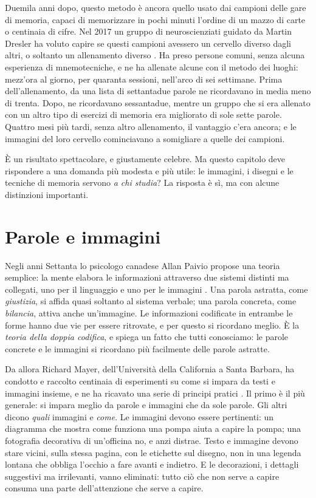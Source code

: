 Duemila anni dopo, questo metodo è ancora quello usato dai campioni delle
gare di memoria, capaci di memorizzare in pochi minuti
l'ordine di un mazzo di carte o centinaia di cifre. Nel 2017 un gruppo
di neuroscienziati guidato da Martin Dresler ha voluto capire se questi
campioni avessero un cervello diverso dagli altri, o soltanto un
allenamento diverso \parencite{dresler2017}. Ha preso persone comuni,
senza alcuna esperienza di mnemotecniche, e ne ha allenate alcune con
il metodo dei luoghi: mezz'ora al giorno, per quaranta sessioni, nell'arco
di sei settimane. Prima dell'allenamento, da una lista di settantadue
parole ne ricordavano in media meno di trenta. Dopo, ne ricordavano
sessantadue, mentre un gruppo che si era allenato con un altro tipo di
esercizi di memoria era migliorato di sole sette parole. Quattro mesi
più tardi, senza altro allenamento, il vantaggio c'era ancora; e le
immagini del loro cervello cominciavano a somigliare a quelle dei
campioni.

È un risultato spettacolare, e giustamente celebre. Ma questo capitolo
deve rispondere a una domanda più modesta e più utile: le immagini, i
disegni e le tecniche di memoria servono \emph{a chi studia}? La
risposta è sì, ma con alcune distinzioni importanti.

\section{Parole e immagini}

Negli anni Settanta lo psicologo canadese Allan Paivio propose una
teoria semplice: la mente elabora le informazioni attraverso due
sistemi distinti ma collegati, uno per il linguaggio e uno per le
immagini \parencite{paivio1986}. Una parola astratta, come
\emph{giustizia}, si affida quasi soltanto al sistema verbale; una
parola concreta, come \emph{bilancia}, attiva anche un'immagine. Le
informazioni codificate in entrambe le forme hanno due vie per essere
ritrovate, e per questo si ricordano meglio. È la \emph{teoria della
doppia codifica}, e spiega un fatto che tutti conosciamo: le parole
concrete e le immagini si ricordano più facilmente delle parole
astratte.

Da allora Richard Mayer, dell'Università della California a Santa
Barbara, ha condotto e raccolto centinaia di esperimenti su come si
impara da testi e immagini insieme, e ne ha ricavato una serie di
principi pratici \parencite{mayer2020}. Il primo è il più generale: si
impara meglio da parole e immagini che da sole parole. Gli altri dicono
\emph{quali} immagini e \emph{come}. Le immagini devono essere
pertinenti: un diagramma che mostra come funziona una pompa aiuta a
capire la pompa; una fotografia decorativa di un'officina no, e anzi
distrae. Testo e immagine devono stare vicini, sulla stessa pagina,
con le etichette sul disegno, non in una legenda lontana che obbliga
l'occhio a fare avanti e indietro. E le decorazioni, i dettagli
suggestivi ma irrilevanti, vanno eliminati: tutto ciò che non serve a
capire consuma una parte dell'attenzione che serve a capire.

